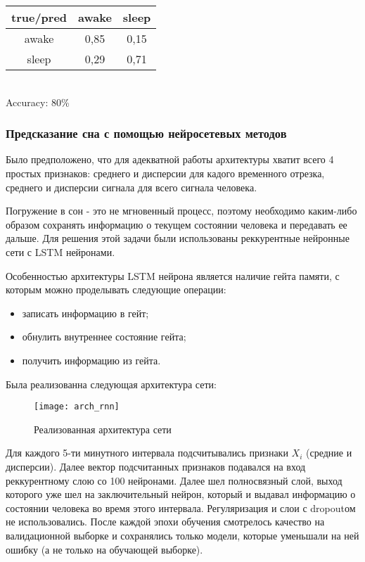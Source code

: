 \begin{tabular}{|c|c|c|}
	\hline \rule[-2ex]{0pt}{5.5ex} true/pred & awake & sleep \\ 
	\hline \rule[-2ex]{0pt}{5.5ex} awake & 0,85 & 0,15 \\ 
	\hline \rule[-2ex]{0pt}{5.5ex} sleep & 0,29 & 0,71 \\ 
	\hline 
	
\end{tabular}\\

Accuracy:  80\%

\subsubsection{Предсказание сна с помощью нейросетевых методов}
Было предположено, что для адекватной работы архитектуры хватит всего 4 простых признаков: среднего и дисперсии для кадого временного отрезка, среднего и дисперсии сигнала для всего сигнала человека.

Погружение в сон - это не мгновенный процесс, поэтому необходимо каким-либо образом сохранять информацию о текущем состоянии человека и передавать ее дальше. Для решения этой задачи были использованы реккурентные нейронные сети с LSTM нейронами. 

Особенностью архитектуры LSTM нейрона является наличие гейта памяти, с которым можно проделывать следующие операции:
\begin{itemize}
	\item записать информацию в гейт;
	\item обнулить внутреннее состояние гейта;
	\item получить информацию из гейта.
\end{itemize}

Была реализованна следующая архитектура сети:

\begin{figure}[h]
	\begin{center}
		\texttt{[image: arch\_rnn]}
		\caption{Реализованная архитектура сети}
		\label{ris:arh_rnn}
	\end{center}
\end{figure}

Для каждого 5-ти минутного интервала подсчитывались признаки $X_i$ (средние и дисперсии). Далее вектор подсчитанных признаков подавался на вход реккурентному слою со 100 нейронами. Далее шел полносвязный слой, выход которого уже шел на заключительный нейрон, который и выдавал информацию о состоянии человека во время этого интервала. Регуляризация и слои с dropoutом не использовались. После каждой эпохи обучения смотрелось качество на валидационной выборке и сохранялись только модели, которые уменьшали на ней ошибку (а не только на обучающей выборке). 

